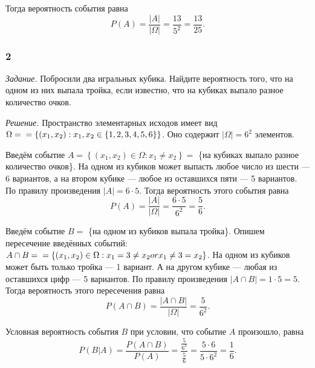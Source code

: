 Тогда вероятность события равна
$$P \left( A \right) =
\frac{ \left| A \right| }{ \left| \Omega \right| } =
\frac{13}{5^2} =
\frac{13}{25}.$$

\subsubsection*{2}

\textit{Задание.} Побросили два игральных кубика.
Найдите вероятность того, что на одном из них выпала тройка, если известно, что на кубиках выпало разное количество очков.

\textit{Решение.}
Пространство элементарных исходов имеет вид $ \Omega =  \\
= \left\{ \left( x_1, x_2 \right): x_1, x_2 \in \left\{ 1, 2, 3, 4, 5, 6\right\} \right\} $.
Оно содержит $ \left| \Omega \right| = 6^2$ элементов.

Введём событие $A = \left\{ \left( x_1, x_2 \right) \in \Omega: x_1 \neq x_2 \right\} =$ \{на кубиках выпало разное количество очков\}.
На одном из кубиков может выпасть любое число из шести --- 6 вариантов, а на втором кубике --- любое из оставшихся пяти --- 5 вариантов.
По правилу произведения $ \left| A \right| = 6 \cdot 5$.
Тогда вероятность этого события равна
$$P \left( A \right) =
\frac{ \left| A \right| }{ \left| \Omega \right| } =
\frac{6 \cdot 5}{6^2} =
\frac{5}{6}.$$

Введём событие $B = $ \{на одном из кубиков выпала тройка\}.
Опишем пересечение введённых событий: $A \cap B =  \\
= \left\{ \left( x_1, x_2 \right) \in \Omega: x_1 = 3 \neq x_2 or x_1 \neq 3 = x_2 \right\} $.
На одном из кубиков может быть только тройка --- 1 вариант.
А на другом кубике --- любая из оставшихся цифр --- 5 вариантов.
По правилу произведения $ \left| A \cap B \right| = 1 \cdot 5 = 5$.
Тогда вероятность этого пересечения равна
$$P \left( A \cap B \right) =
\frac{ \left| A \cap B \right| }{ \left| \Omega \right| } =
\frac{5}{6^2}.$$

Условная вероятность события $B$ при условии, что событие $A$ произошло, равна
$$P \left( \left. B \right| A \right) =
\frac{P \left( A \cap B \right) }{P \left( A \right) } =
\frac{ \frac{5}{6^2} }{ \frac{5}{6} } =
\frac{5 \cdot 6}{5 \cdot 6^2} =
\frac{1}{6}.$$
